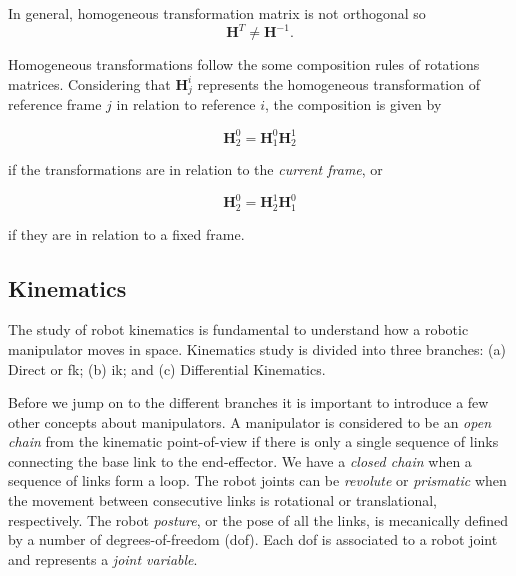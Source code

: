 In general, homogeneous transformation matrix is not orthogonal so 
\begin{equation}
    \boldsymbol{H}^{T} \neq \boldsymbol{H}^{-1}.
\end{equation}

Homogeneous transformations follow the some composition rules of rotations matrices. Considering that $\boldsymbol{H}^{i}_{j}$ represents the homogeneous transformation of reference frame $j$ in relation to reference $i$, the composition is given by

\begin{equation}
    \boldsymbol{H}^{0}_{2} = \boldsymbol{H}^{0}_{1}\boldsymbol{H}^{1}_{2}
\end{equation}

if the transformations are in relation to the \emph{current frame}, or

\begin{equation}
    \boldsymbol{H}^{0}_{2} = \boldsymbol{H}^{1}_{2}\boldsymbol{H}^{0}_{1}
\end{equation}

if they are in relation to a fixed frame.



\subsection{Kinematics}
\label{subsec:kinematics}

The study of robot kinematics is fundamental to understand how a robotic manipulator moves in space. Kinematics study is divided into three branches: (a) Direct or \gls{fk}; (b) \gls{ik}; and (c) Differential Kinematics.\bigskip

Before we jump on to the different branches it is important to introduce a few other concepts about manipulators. A manipulator is considered to be an \emph{open chain} from the kinematic point-of-view if there is only a single sequence of links connecting the base link to the end-effector. We have a \emph{closed chain} when a sequence of links form a loop. The robot joints can be \emph{revolute} or \emph{prismatic} when the movement between consecutive links is rotational or translational, respectively. The robot \emph{posture}, or the pose of all the links, is mecanically defined by a number of degrees-of-freedom (\gls{dof}). Each \gls{dof} is associated to a robot joint and represents a \emph{joint variable}.


